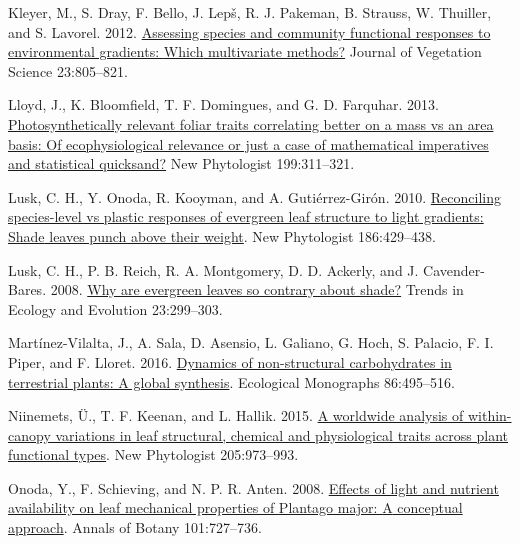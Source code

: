 \documentclass[
  12pt,
  a4paper,
,tablecaptionabove
]{scrartcl}
\newlength{\cslhangindent}
\newenvironment{CSLReferences}[2] %
 {%
  \setlength{\parindent}{0pt}
  \ifodd #1 \everypar{\setlength{\hangindent}{\cslhangindent}}\ignorespaces\fi
  \ifnum #2 > 0
  \setlength{\parskip}{#2\baselineskip}
  \fi
 }%
 {}
\begin{document}
\begin{CSLReferences}{1}{0}
\leavevmode{}%
Kleyer, M., S. Dray, F. Bello, J. Lepš, R. J. Pakeman, B. Strauss, W. Thuiller, and S. Lavorel. 2012. \href{https://doi.org/10.1111/j.1654-1103.2012.01402.x}{Assessing species and community functional responses to environmental gradients: {Which} multivariate methods?} Journal of Vegetation Science 23:805--821.

\leavevmode{}%
Lloyd, J., K. Bloomfield, T. F. Domingues, and G. D. Farquhar. 2013. \href{https://doi.org/10.1111/nph.12281}{Photosynthetically relevant foliar traits correlating better on a mass vs an area basis: {Of} ecophysiological relevance or just a case of mathematical imperatives and statistical quicksand?} New Phytologist 199:311--321.

\leavevmode{}%
Lusk, C. H., Y. Onoda, R. Kooyman, and A. Gutiérrez-Girón. 2010. \href{https://doi.org/10.1111/j.1469-8137.2010.03202.x}{Reconciling species-level vs plastic responses of evergreen leaf structure to light gradients: {Shade} leaves punch above their weight}. New Phytologist 186:429--438.

\leavevmode{}%
Lusk, C. H., P. B. Reich, R. A. Montgomery, D. D. Ackerly, and J. Cavender-Bares. 2008. \href{https://doi.org/10.1016/j.tree.2008.02.006}{Why are evergreen leaves so contrary about shade?} Trends in Ecology and Evolution 23:299--303.

\leavevmode{}%
Martínez-Vilalta, J., A. Sala, D. Asensio, L. Galiano, G. Hoch, S. Palacio, F. I. Piper, and F. Lloret. 2016. \href{https://doi.org/10.1002/ecm.1231}{Dynamics of non-structural carbohydrates in terrestrial plants: A global synthesis}. Ecological Monographs 86:495--516.

\leavevmode{}%
Niinemets, Ü., T. F. Keenan, and L. Hallik. 2015. \href{https://doi.org/10.1111/nph.13096}{A worldwide analysis of within-canopy variations in leaf structural, chemical and physiological traits across plant functional types}. New Phytologist 205:973--993.

\leavevmode{}%
Onoda, Y., F. Schieving, and N. P. R. Anten. 2008. \href{https://doi.org/10.1093/aob/mcn013}{Effects of light and nutrient availability on leaf mechanical properties of {Plantago} major: {A} conceptual approach}. Annals of Botany 101:727--736.


\end{CSLReferences}
\end{document}
